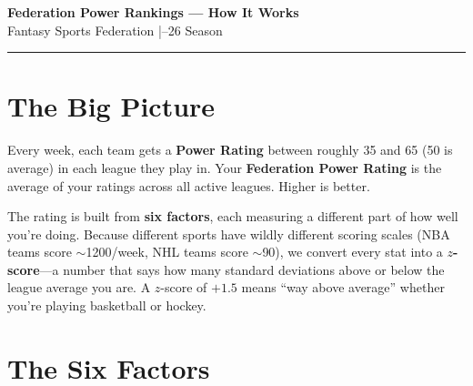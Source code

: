 \documentclass[11pt,letterpaper]{article}
\begin{document}
\begin{center}
{\LARGE\bfseries\color{fedblue} Federation Power Rankings --- How It Works}\\[4pt]
{\color{dimgray} Fantasy Sports Federation \quad|--26 Season}
\end{center}
\vspace{-4pt}
\textcolor{fedblue}{\rule{\textwidth}{0.8pt}}

\section{The Big Picture}

Every week, each team gets a \textbf{Power Rating} between roughly 35 and 65 (50 is average) in each league they play in. Your \textbf{Federation Power Rating} is the average of your ratings across all active leagues. Higher is better.

The rating is built from \textbf{six factors}, each measuring a different part of how well you're doing. Because different sports have wildly different scoring scales (NBA teams score $\sim$1200/week, NHL teams score $\sim$90), we convert every stat into a \textbf{$z$-score}---a number that says how many standard deviations above or below the league average you are. A $z$-score of $+1.5$ means ``way above average'' whether you're playing basketball or hockey.

\section{The Six Factors}
\end{document}
